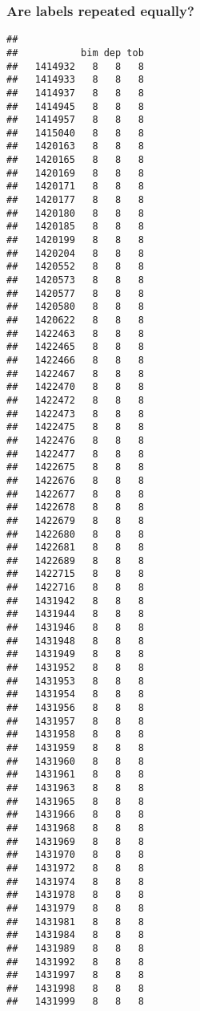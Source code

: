 \documentclass[
]{article}
\newenvironment{Shaded}{\begin{snugshade}}{\end{snugshade}}
\newcommand{\KeywordTok}[1]{\textcolor[rgb]{0.13,0.29,0.53}{\textbf{#1}}}
\newcommand{\NormalTok}[1]{#1}
\newcommand{\OperatorTok}[1]{\textcolor[rgb]{0.81,0.36,0.00}{\textbf{#1}}}
\begin{document}
\hypertarget{are-labels-repeated-equally}{%
\subsubsection{Are labels repeated
equally?}\label{are-labels-repeated-equally}}

\begin{Shaded}
\end{Shaded}

\begin{verbatim}
##          
##           bim dep tob
##   1414932   8   8   8
##   1414933   8   8   8
##   1414937   8   8   8
##   1414945   8   8   8
##   1414957   8   8   8
##   1415040   8   8   8
##   1420163   8   8   8
##   1420165   8   8   8
##   1420169   8   8   8
##   1420171   8   8   8
##   1420177   8   8   8
##   1420180   8   8   8
##   1420185   8   8   8
##   1420199   8   8   8
##   1420204   8   8   8
##   1420552   8   8   8
##   1420573   8   8   8
##   1420577   8   8   8
##   1420580   8   8   8
##   1420622   8   8   8
##   1422463   8   8   8
##   1422465   8   8   8
##   1422466   8   8   8
##   1422467   8   8   8
##   1422470   8   8   8
##   1422472   8   8   8
##   1422473   8   8   8
##   1422475   8   8   8
##   1422476   8   8   8
##   1422477   8   8   8
##   1422675   8   8   8
##   1422676   8   8   8
##   1422677   8   8   8
##   1422678   8   8   8
##   1422679   8   8   8
##   1422680   8   8   8
##   1422681   8   8   8
##   1422689   8   8   8
##   1422715   8   8   8
##   1422716   8   8   8
##   1431942   8   8   8
##   1431944   8   8   8
##   1431946   8   8   8
##   1431948   8   8   8
##   1431949   8   8   8
##   1431952   8   8   8
##   1431953   8   8   8
##   1431954   8   8   8
##   1431956   8   8   8
##   1431957   8   8   8
##   1431958   8   8   8
##   1431959   8   8   8
##   1431960   8   8   8
##   1431961   8   8   8
##   1431963   8   8   8
##   1431965   8   8   8
##   1431966   8   8   8
##   1431968   8   8   8
##   1431969   8   8   8
##   1431970   8   8   8
##   1431972   8   8   8
##   1431974   8   8   8
##   1431978   8   8   8
##   1431979   8   8   8
##   1431981   8   8   8
##   1431984   8   8   8
##   1431989   8   8   8
##   1431992   8   8   8
##   1431997   8   8   8
##   1431998   8   8   8
##   1431999   8   8   8

\end{verbatim}
\end{document}

